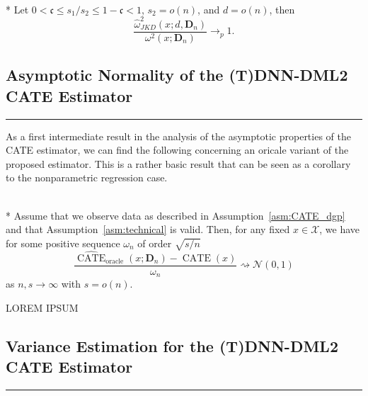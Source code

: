 \begin{boxD}
	\begin{thm}\label{thm:JKD_Cons}\mbox{}\\*
		Let $0 < \mathfrak{c} \leq s_1/s_2 \leq 1 - \mathfrak{c} < 1$, $s_2 = o(n)$, and $d = o(n)$, then
		\begin{equation}
			\frac{\hat{\omega}_{JKD}^2\left(x; d, \mathbf{D}_n\right)}{\omega^{2}\left(x; \mathbf{D}_n\right)} \longrightarrow_{p} 1.
		\end{equation}
	\end{thm}
\end{boxD}

\newpage
\subsection{Asymptotic Normality of the (T)DNN-DML2 CATE Estimator}\label{CATE_AsympNorm}
\hrule

As a first intermediate result in the analysis of the asymptotic properties of the CATE estimator, we can find the following concerning an oricale variant of the proposed estimator.
This is a rather basic result that can be seen as a corollary to the nonparametric regression case.
\begin{boxD}
	\begin{thm}\label{thm:DNNDML2_anorm_0}\mbox{}\\*
		Assume that we observe data as described in Assumption~\ref{asm:CATE_dgp} and that Assumption~\ref{asm:technical} is valid.
		Then, for any fixed $x \in \mathcal{X}$, we have for some positive sequence $\omega_n$ of order $\sqrt{s/n}$
		\begin{equation}
			\frac{\hat{\operatorname{CATE}}_{\text{oracle}}(x; \mathbf{D}_n) - \operatorname{CATE}(x)}{\omega_n}
			\rightsquigarrow \mathcal{N}\left(0,1\right)
		\end{equation}
		as $n,s \rightarrow \infty$ with $s = o(n)$.
	\end{thm}
\end{boxD}

{\color{red} LOREM IPSUM}

\subsection{Variance Estimation for the (T)DNN-DML2 CATE Estimator}\label{CATE_Var_Ests}
\hrule

